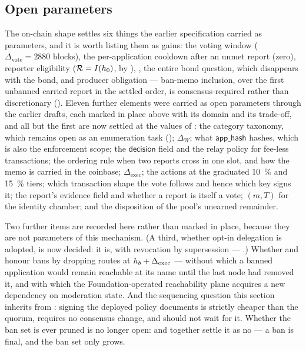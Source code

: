 \subsection{Open parameters}
\label{sec:23:open}

The on-chain shape settles six things the earlier specification carried as parameters, and it is
worth listing them as gains: the voting window ($\Delta_{\mathrm{vote}} = \num{2880}$ blocks), the
per-application cooldown after an unmet report (zero), reporter eligibility
($\mathcal{R} = I(h_0)$, by ), , the entire bond question, which
disappears with the bond, and producer obligation --- ban-memo inclusion, over the first unbanned
carried report in the settled order, is consensus-required rather than discretionary
(). Eleven
further elements were carried as open parameters through the earlier drafts, each marked in place
above with its domain and its trade-off, and all but the first are now settled at the values of
: the category taxonomy, which remains open as an enumeration task
(); $\Delta_W$; what $\mathsf{app\_hash}$ hashes, which is
also the enforcement scope; the $\mathsf{decision}$ field and the relay policy for fee-less
transactions; the ordering rule when two reports cross in
one slot, and how the memo is carried in the coinbase; $\Delta_{\mathrm{exec}}$; the actions at the
graduated \SI{10}{\percent} and \SI{15}{\percent} tiers; which transaction shape the vote follows
and hence which key signs it; the report's evidence field and whether a report is itself a vote;
$(m, T)$ for the identity chamber; and the disposition of the pool's unearned remainder.

Two further items are recorded here rather than marked in place, because they are not parameters of
this mechanism. (A third, whether opt-in delegation is adopted, is now decided: it is, with
revocation by supersession --- .) Whether \FDM{} and \PDNS{} honour bans by dropping routes at
$h_b + \Delta_{\mathrm{exec}}$ — without which a banned application would remain reachable at its
name until the last node had removed it, and with which the Foundation-operated reachability plane
acquires a new dependency on moderation state. And the sequencing question this section
inherits from : signing the deployed policy documents is strictly cheaper than
the quorum, requires no consensus change, and should not wait for it. Whether the ban set is ever
pruned is no longer open:  and  together settle it
as no --- a ban is final, and the ban set only grows.

